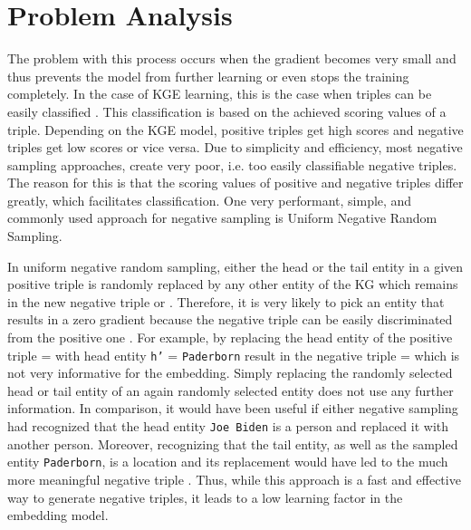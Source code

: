 \section{Problem Analysis}
\label{sec:problem_analysis}
The problem with this process occurs when the gradient becomes very small and thus prevents the model from further learning or even stops the training completely.
In the case of KGE learning, this is the case when triples can be easily classified \cite{zhang2021efficient}. 
This classification is based on the achieved scoring values of a triple.
Depending on the KGE model, positive triples get high scores and negative triples get low scores or vice versa. 
Due to simplicity and efficiency, most negative sampling approaches, create very poor, i.e. too easily classifiable negative triples. 
The reason for this is that the scoring values of positive and negative triples differ greatly, which facilitates classification. 
One very performant, simple, and commonly used approach for negative sampling is Uniform Negative Random Sampling.

In uniform negative random sampling, either the head or the tail entity in a given positive triple  is randomly replaced by any other entity of the \ac{KG} which remains in the new negative triple  or . 
Therefore, it is very likely to pick an entity that results in a zero gradient because the negative triple can be easily discriminated from the positive one \cite{cai2017kbgan}.
For example, by replacing the head entity of the positive triple  =  with head entity \texttt{h'} = \texttt{Paderborn} result in the negative triple  =   which is not very informative for the embedding.
Simply replacing the randomly selected head or tail entity of an again randomly selected entity does not use any further information.
In comparison, it would have been useful if either negative sampling had recognized that the head entity \texttt{Joe Biden} is a person and replaced it with another person.
Moreover, recognizing that the tail entity, as well as the sampled entity \texttt{Paderborn}, is a location and its replacement would have led to the much more meaningful negative triple .  
Thus, while this approach is a fast and effective way to generate negative triples, it leads to a low learning factor in the embedding model.

